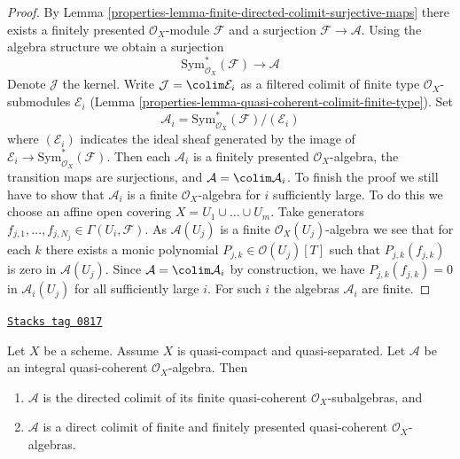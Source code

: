 \begin{proof}

By Lemma \ref{properties-lemma-finite-directed-colimit-surjective-maps}
there exists a finitely presented $\mathcal{O}_X$-module
$\mathcal{F}$ and a surjection $\mathcal{F} \to \mathcal{A}$.
Using the algebra structure we obtain a surjection
$$
\text{Sym}^*_{\mathcal{O}_X}(\mathcal{F}) \longrightarrow \mathcal{A}
$$
Denote $\mathcal{J}$ the kernel. Write $\mathcal{J} = \colim \mathcal{E}_i$
as a filtered colimit of finite type $\mathcal{O}_X$-submodules
$\mathcal{E}_i$ (Lemma \ref{properties-lemma-quasi-coherent-colimit-finite-type}). Set
$$
\mathcal{A}_i = \text{Sym}^*_{\mathcal{O}_X}(\mathcal{F})/(\mathcal{E}_i)
$$
where $(\mathcal{E}_i)$ indicates the ideal sheaf generated by
the image of $\mathcal{E}_i \to \text{Sym}^*_{\mathcal{O}_X}(\mathcal{F})$.
Then each $\mathcal{A}_i$ is a finitely presented $\mathcal{O}_X$-algebra,
the transition maps are surjections,
and $\mathcal{A} = \colim \mathcal{A}_i$. To finish the proof we still
have to show that $\mathcal{A}_i$ is a finite $\mathcal{O}_X$-algebra
for $i$ sufficiently large. To do this we choose an affine open
covering $X = U_1 \cup \ldots \cup U_m$. Take generators
$f_{j, 1}, \ldots, f_{j, N_j} \in \Gamma(U_i, \mathcal{F})$.
As $\mathcal{A}(U_j)$ is a finite $\mathcal{O}_X(U_j)$-algebra we
see that for each $k$ there exists a monic polynomial
$P_{j, k} \in \mathcal{O}(U_j)[T]$ such that $P_{j, k}(f_{j, k})$
is zero in $\mathcal{A}(U_j)$. Since
$\mathcal{A} = \colim \mathcal{A}_i$ by construction, we
have $P_{j, k}(f_{j, k}) = 0$ in $\mathcal{A}_i(U_j)$
for all sufficiently large $i$. For such $i$ the algebras
$\mathcal{A}_i$ are finite.
\end{proof}

\begin{lemma}
\label{properties-lemma-integral-algebra-directed-colimit-finite}
\href{https://stacks.math.columbia.edu/tag/0817}{\texttt{Stacks tag 0817}}

Let $X$ be a scheme. Assume $X$ is quasi-compact and quasi-separated.
Let $\mathcal{A}$ be an integral quasi-coherent $\mathcal{O}_X$-algebra.
Then
\begin{enumerate}
\item $\mathcal{A}$ is the directed colimit of its finite
quasi-coherent $\mathcal{O}_X$-subalgebras, and
\item $\mathcal{A}$ is a direct colimit of finite and finitely
presented quasi-coherent $\mathcal{O}_X$-algebras.
\end{enumerate}
\end{lemma}

